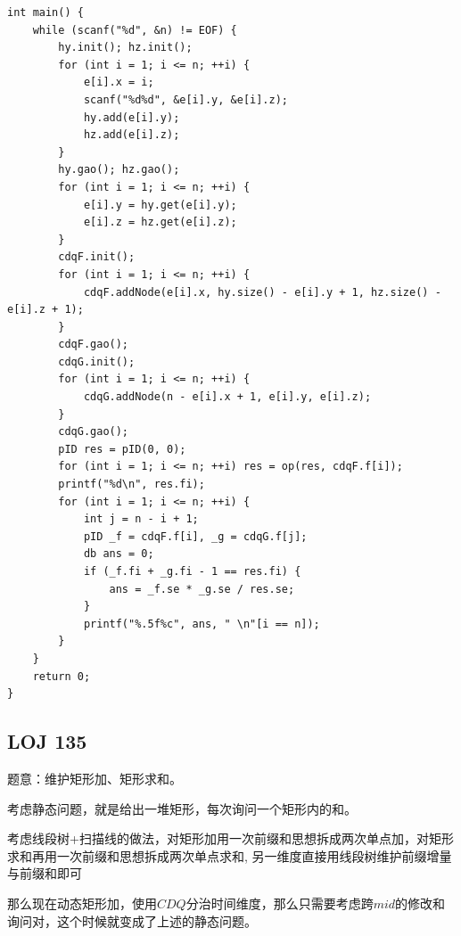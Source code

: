 \begin{lstlisting}
int main() {
	while (scanf("%d", &n) != EOF) {
		hy.init(); hz.init(); 
		for (int i = 1; i <= n; ++i) {
			e[i].x = i;
			scanf("%d%d", &e[i].y, &e[i].z);
			hy.add(e[i].y);
			hz.add(e[i].z);
		}
		hy.gao(); hz.gao();
		for (int i = 1; i <= n; ++i) {
			e[i].y = hy.get(e[i].y);
			e[i].z = hz.get(e[i].z);
		}
		cdqF.init();
		for (int i = 1; i <= n; ++i) {
			cdqF.addNode(e[i].x, hy.size() - e[i].y + 1, hz.size() - e[i].z + 1);
		}
		cdqF.gao();
		cdqG.init();
		for (int i = 1; i <= n; ++i) {
			cdqG.addNode(n - e[i].x + 1, e[i].y, e[i].z);
		}
		cdqG.gao();
		pID res = pID(0, 0);
		for (int i = 1; i <= n; ++i) res = op(res, cdqF.f[i]);
		printf("%d\n", res.fi);
		for (int i = 1; i <= n; ++i) {
			int j = n - i + 1;
			pID _f = cdqF.f[i], _g = cdqG.f[j];
			db ans = 0; 
			if (_f.fi + _g.fi - 1 == res.fi) {
				ans = _f.se * _g.se / res.se;
			}
			printf("%.5f%c", ans, " \n"[i == n]);
		}
	}
	return 0;
}
\end{lstlisting}

\subsection{LOJ 135}

题意：维护矩形加、矩形求和。\par

考虑静态问题，就是给出一堆矩形，每次询问一个矩形内的和。\par
考虑线段树+扫描线的做法，对矩形加用一次前缀和思想拆成两次单点加，对矩形求和再用一次前缀和思想拆成两次单点求和, 另一维度直接用线段树维护前缀增量与前缀和即可\par

那么现在动态矩形加，使用$CDQ$分治时间维度，那么只需要考虑跨$mid$的修改和询问对，这个时候就变成了上述的静态问题。\par


